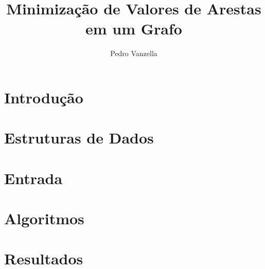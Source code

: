 \documentclass[12pt]{article}
\title{Minimização de Valores de Arestas em um Grafo}
\author{Pedro Vanzella}
\begin{document}
\maketitle

\section{Introdução}\label{sec:intro}

\section{Estruturas de Dados}\label{sec:estruturas}

\section{Entrada}\label{sec:entrada}

\section{Algoritmos}\label{sec:algoritmos}

\section{Resultados}\label{sec:resultados}
\end{document}
